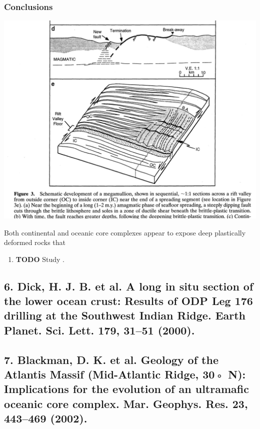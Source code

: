 \documentclass[11pt]{article}
\begin{document}
\subsubsection{Conclusions}
\label{sec-1-2-5}
\includegraphics[width=.9\linewidth]{./fig1_high_angle_fault_at_OCC_surface.png}

Both continental and oceanic core complexes appear to expose deep plastically deformed rocks that 

\begin{enumerate}
\item {\bfseries\sffamily TODO} Study .
\label{sec-1-2-5-1}
\end{enumerate}

\subsection{6. Dick, H. J. B. et al. A long in situ section of the lower ocean crust: Results of ODP Leg 176 drilling at the Southwest Indian Ridge. Earth Planet. Sci. Lett. 179, 31–51 (2000).}
\label{sec-1-3}
\subsection{7. Blackman, D. K. et al. Geology of the Atlantis Massif (Mid-Atlantic Ridge, 30◦ N): Implications for the evolution of an ultramafic oceanic core complex. Mar. Geophys. Res. 23, 443–469 (2002).}
\label{sec-1-4}
\end{document}
